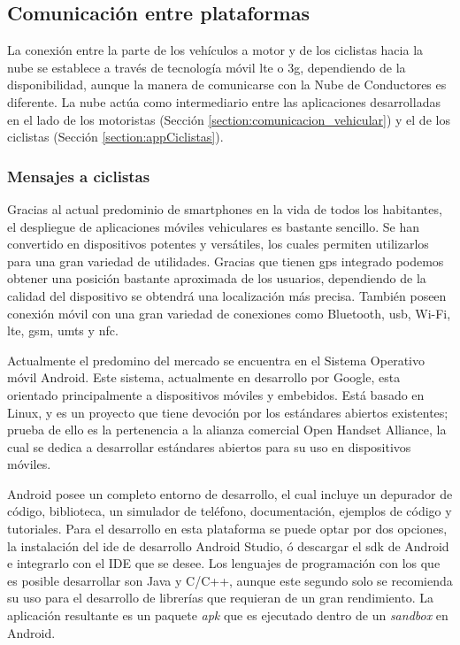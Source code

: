 \subsection{Comunicación entre plataformas}\label{ssection:comunicacion_plataformas}
La conexión entre la parte de los vehículos a motor y de los ciclistas hacia la
nube se establece a través de tecnología móvil \gls{lte} o \gls{3g},
dependiendo de la disponibilidad, aunque la manera de comunicarse con la Nube
de Conductores es diferente. La nube actúa como intermediario entre las
aplicaciones desarrolladas en el lado de los motoristas (Sección
\ref{section:comunicacion_vehicular}) y el de los ciclistas (Sección
\ref{section:appCiclistas}).

\subsubsection{Mensajes a ciclistas}\label{sssection:mensajes_ciclistas}
Gracias al actual predominio de smartphones en la vida de todos los habitantes,
el despliegue de aplicaciones móviles vehiculares es bastante sencillo. Se han
convertido en dispositivos potentes y versátiles, los cuales permiten
utilizarlos para una gran variedad de utilidades. Gracias que tienen \gls{gps}
integrado podemos obtener una posición bastante aproximada de los usuarios,
dependiendo de la calidad del dispositivo se obtendrá una localización más
precisa. También poseen conexión móvil con una gran variedad de conexiones como
Bluetooth, \gls{usb}, Wi-Fi, \gls{lte}, \gls{gsm}, \gls{umts} y \gls{nfc}.

Actualmente el predomino del mercado se encuentra en el Sistema Operativo móvil
Android. Este sistema, actualmente en desarrollo por Google, esta orientado
principalmente a dispositivos móviles y embebidos. Está basado en Linux, y es
un proyecto que tiene devoción por los estándares abiertos existentes; prueba
de ello es la pertenencia a la alianza comercial Open Handset Alliance, la cual
se dedica a desarrollar estándares abiertos para su uso en dispositivos móviles.

Android posee un completo entorno de desarrollo, el cual incluye un depurador
de código, biblioteca, un simulador de teléfono, documentación, ejemplos de
código y tutoriales. Para el desarrollo en esta plataforma se puede optar por
dos opciones, la instalación del \gls{ide} de desarrollo Android Studio, ó
descargar el \gls{sdk} de Android e integrarlo con el IDE que se desee. Los
lenguajes de programación con los que es posible desarrollar son Java y C/C++,
aunque este segundo solo se recomienda su uso para el desarrollo de librerías
que requieran de un gran rendimiento. La aplicación resultante es un paquete
\emph{apk} que es ejecutado dentro de un \emph{sandbox} en Android.

